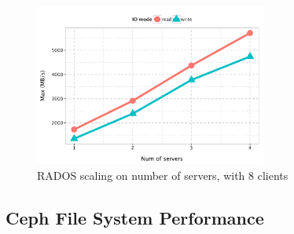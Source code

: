 
%

\begin{figure}[htb]
\centering
\includegraphics[width=3in]{data/rados_server}
\caption{RADOS scaling on number of servers, with 8 clients}
\label{fig:oss-scale}
\end{figure}

\subsection{Ceph File System Performance}
\label{sec:ior-initial}

